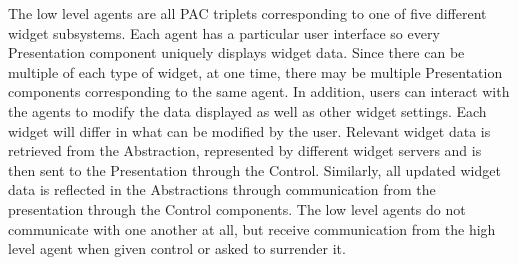 \documentclass[]{article}
\begin{document}
The low level agents are all PAC triplets corresponding to one of five different widget subsystems. Each agent has a particular user interface so every Presentation component uniquely displays widget data. Since there can be multiple of each type of widget, at one time, there may be multiple Presentation components corresponding to the same agent. In addition, users can interact with the agents to modify the data displayed as well as other widget settings. Each widget will differ in what can be modified by the user. Relevant widget data is retrieved from the Abstraction, represented by different widget servers and is then sent to the Presentation through the Control. Similarly, all updated widget data is reflected in the Abstractions through communication from the presentation through the Control components. The low level agents do not communicate with one another at all, but receive communication from the high level agent when given control or asked to surrender it.



\end{document}
